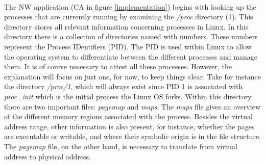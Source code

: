 \paragraph*{}
The NW application (CA in figure \ref{implementation}) begins with looking up the processes that are currently running by examining the \textit{/proc} directory (1). This directory stores all relevant information concerning processes in Linux. In this directory there is a collection of directories named with numbers. These numbers represent the Process IDentifiers (PID). The PID is used within Linux to allow the operating system to differentiate between the different processes and manage them. It is of course necessary to attest all these processes. However, the explanation will focus on just one, for now, to keep things clear. Take for instance the directory \textit{/proc/1}, which will always exist since PID 1 is associated with \textit{proc\_init} which is the initial process the Linux OS forks. Within this directory there are two important files: \textit{pagemap} and \textit{maps}. The \textit{maps} file gives an overview of the different memory regions associated with the process. Besides the virtual address range, other information is also present, for instance, whether the pages are executable or writable, and where their symbolic origin is in the file structure. The \textit{pagemap} file, on the other hand, is necessary to translate from virtual address to physical address.

